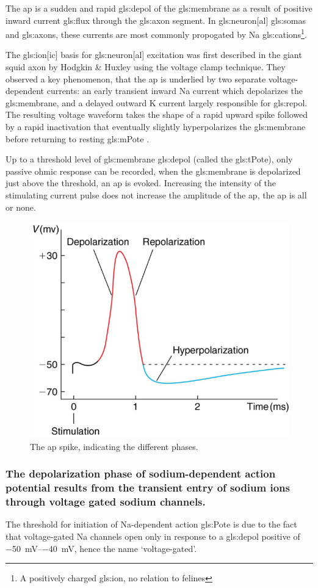 \documentclass[class={myRUCProject}, crop=false]{standalone}
\begin{document}
The \gls{ap} is a sudden and rapid \gls{gls:depol} of the \gls{gls:membrane} as a result of positive inward current \gls{gls:flux} through the \gls{gls:axon} segment. In \gls{gls:neuron}[al] \glspl{gls:soma} and \glspl{gls:axon}, these currents are most commonly propogated by \gls{Na} \glspl{gls:cation}\footnote{A positively charged \gls{gls:ion}, no relation to felines}.

The \gls{gls:ion}[ic] basis for \gls{gls:neuron}[al] excitation was first described in the giant squid axon by Hodgkin \& Huxley  using the voltage clamp technique. They observed a key phenomenon, that the \gls{ap} is underlied by two separate voltage-dependent currents: an early transient inward \gls{Na} current which depolarizes the \gls{gls:membrane}, and a delayed outward \gls{K} current largely responsible for \gls{gls:repol}. The resulting voltage waveform takes the shape of a rapid upward spike followed by a rapid inactivation that eventually slightly hyperpolarizes the \gls{gls:membrane} before returning to resting \gls{gls:mPote} .

Up to a threshold level of \gls{gls:membrane} \gls{gls:depol} (called the \gls{gls:tPote}), only passive ohmic response can be recorded, when the \gls{gls:membrane} is depolarized just above the threshold, an \gls{ap} is evoked. 
Increasing the intensity of the stimulating current pulse does not increase the amplitude of the \gls{ap},  the \gls{ap} is all or none. 
\begin{figure}[H]
    \centering
    \includegraphics[width=0.5\linewidth]{Pictures//Anakin/AP.png}
    \caption{The \gls{ap} spike, indicating the different phases.}
    \label{fig:AP}
\end{figure}

\subsubsection{The depolarization phase of sodium-dependent action potential results from the transient entry of sodium ions through voltage gated sodium channels.}
The threshold  for initiation of \gls{Na}-dependent  action  \gls{gls:Pote} is due to the fact that voltage-gated \gls{Na} channels open only  in  response  to  a  \gls{gls:depol}  positive  of \qtyrange{-50}{-40}{\mV}, hence the name `voltage-gated'. 
\end{document}
